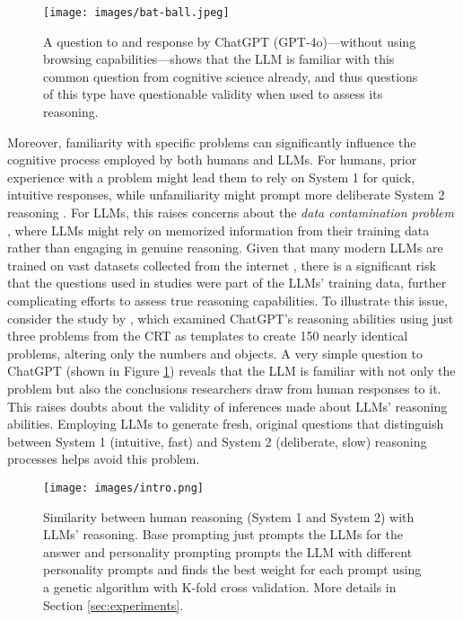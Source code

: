     \begin{figure}
        \centering
        \texttt{[image: images/bat-ball.jpeg]}
        \caption{A question to and response by ChatGPT (GPT-4o)---without using browsing capabilities---shows that the LLM is familiar with this common question from cognitive science already, and thus questions of this type have questionable validity when used to assess its reasoning.}
        \label{fig:bat-ball}
    \end{figure}
    
    Moreover, familiarity with specific problems can significantly influence the cognitive process employed by both humans and LLMs. For humans, prior experience with a problem might lead them to rely on System 1 for quick, intuitive responses, while unfamiliarity might prompt more deliberate System 2 reasoning \citep{evans_dual-processing_2008, Kahneman2011, klein_sources_2017}. For LLMs, this raises concerns about the \textit{data contamination problem} \citep{sainz_nlp_2023, balloccu_leak_2024}, where LLMs might rely on memorized information from their training data rather than engaging in genuine reasoning. Given that many modern LLMs \citep{brown_language_2020, almazrouei_falcon_2023, jiang_mistral_2023, dubey_llama_2024} are trained on vast datasets collected from the internet \citep{penedo_refinedweb_2023, raffel_exploring_2023, together2023redpajama}, there is a significant risk that the questions used in studies were part of the LLMs' training data, further complicating efforts to assess true reasoning capabilities. To illustrate this issue, consider the study by \citet{hagendorff_human-like_2023}, which examined ChatGPT's reasoning abilities using just three problems from the CRT as templates to create 150 nearly identical problems, altering only the numbers and objects. A very simple question to ChatGPT (shown in Figure \ref{fig:bat-ball}) reveals that the LLM is familiar with not only the problem but also the conclusions researchers draw from human responses to it. This raises doubts about the validity of inferences made about LLMs' reasoning abilities. Employing LLMs to generate fresh, original questions that distinguish between System 1 (intuitive, fast) and System 2 (deliberate, slow) reasoning processes helps avoid this problem.

    \begin{figure}
        \centering
        \texttt{[image: images/intro.png]}
        \caption{Similarity between human reasoning (System 1 and System 2) with LLMs' reasoning. Base prompting just prompts the LLMs for the answer and personality prompting prompts the LLM with different personality prompts and finds the best weight for each prompt using a genetic algorithm with K-fold cross validation. More details in Section \ref{sec:experiments}.}
        \label{fig:intro_results}
    \end{figure}

